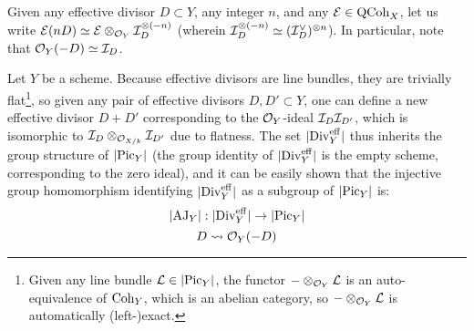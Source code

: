         \begin{convention}
            Given any effective divisor $D \subset Y$, any integer $n$, and any $\mathcal{E} \in \mathrm{QCoh}_X$, let us write $\mathcal{E}(nD) \simeq \mathcal{E} \otimes_{\mathcal{O}_Y} \mathcal{I}_D^{\otimes (-n)}$ (wherein $\mathcal{I}_D^{\otimes (-n)} \simeq (\mathcal{I}_D^{\vee})^{\otimes n}$). In particular, note that $\mathcal{O}_Y(-D) \simeq \mathcal{I}_D$.
        \end{convention}
        \begin{remark} \label{remark: groups_of_effective_divisors}
            Let $Y$ be a scheme. Because effective divisors are line bundles, they are trivially flat\footnote{Given any line bundle $\mathcal{L} \in |\mathrm{Pic}_Y|$, the functor $- \otimes_{\mathcal{O}_Y} \mathcal{L}$ is an auto-equivalence of $\mathrm{Coh}_Y$, which is an abelian category, so $- \otimes_{\mathcal{O}_Y} \mathcal{L}$ is automatically (left-)exact.}, so given any pair of effective divisors $D, D' \subset Y$, one can define a new effective divisor $D + D'$ corresponding to the $\mathcal{O}_Y$-ideal $\mathcal{I}_D \mathcal{I}_{D'}$, which is isomorphic to $\mathcal{I}_D \otimes_{\mathcal{O}_{X/k}} \mathcal{I}_{D'}$ due to flatness. The set $|\mathrm{Div}_Y^{\mathrm{eff}}|$ thus inherits the group structure of $|\mathrm{Pic}_Y|$ (the group identity of $|\mathrm{Div}_Y^{\mathrm{eff}}|$ is the empty scheme, corresponding to the zero ideal), and it can be easily shown that the injective group homomorphism identifying $|\mathrm{Div}_Y^{\mathrm{eff}}|$ as a subgroup of $|\mathrm{Pic}_Y|$ is:
                $$|\mathrm{AJ}_Y|: |\mathrm{Div}_Y^{\mathrm{eff}}| \to |\mathrm{Pic}_Y|$$
                $$D \leadsto \mathcal{O}_Y(-D)$$
        \end{remark}
        
